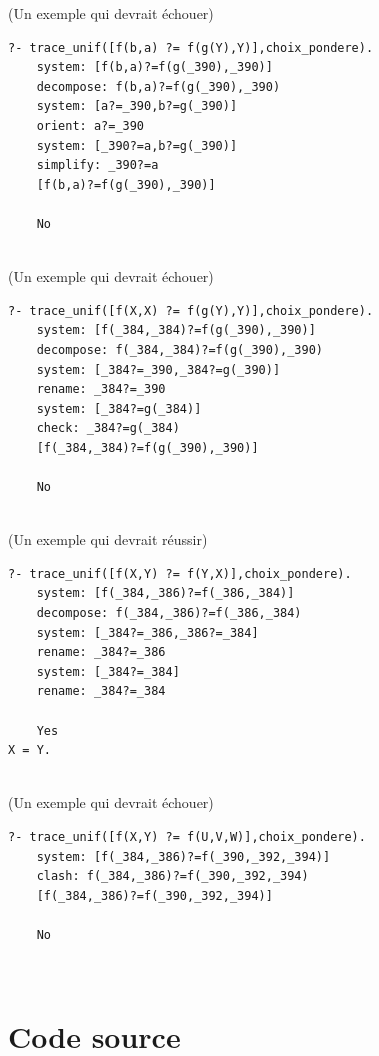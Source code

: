 \documentclass[10pt,a4paper]{report}
\begin{document}
(Un exemple qui devrait échouer)
\begin{lstlisting}[caption ={Des tests de cours}]
?- trace_unif([f(b,a) ?= f(g(Y),Y)],choix_pondere).
	system: [f(b,a)?=f(g(_390),_390)]
	decompose: f(b,a)?=f(g(_390),_390)
	system: [a?=_390,b?=g(_390)]
	orient: a?=_390
	system: [_390?=a,b?=g(_390)]
	simplify: _390?=a
	[f(b,a)?=f(g(_390),_390)]

	No
\end{lstlisting} ~\\

(Un exemple qui devrait échouer)
\begin{lstlisting}[caption ={Des tests de cours}]
?- trace_unif([f(X,X) ?= f(g(Y),Y)],choix_pondere).
	system: [f(_384,_384)?=f(g(_390),_390)]
	decompose: f(_384,_384)?=f(g(_390),_390)
	system: [_384?=_390,_384?=g(_390)]
	rename: _384?=_390
	system: [_384?=g(_384)]
	check: _384?=g(_384)
	[f(_384,_384)?=f(g(_390),_390)]

	No
\end{lstlisting} ~\\[2cm]

(Un exemple qui devrait réussir)
\begin{lstlisting}[caption ={Des tests de cours}]
?- trace_unif([f(X,Y) ?= f(Y,X)],choix_pondere).
	system: [f(_384,_386)?=f(_386,_384)]
	decompose: f(_384,_386)?=f(_386,_384)
	system: [_384?=_386,_386?=_384]
	rename: _384?=_386
	system: [_384?=_384]
	rename: _384?=_384

	Yes
X = Y.
\end{lstlisting} ~\\

(Un exemple qui devrait échouer)
\begin{lstlisting}[caption ={Des tests de cours}]
?- trace_unif([f(X,Y) ?= f(U,V,W)],choix_pondere).
	system: [f(_384,_386)?=f(_390,_392,_394)]
	clash: f(_384,_386)?=f(_390,_392,_394)
	[f(_384,_386)?=f(_390,_392,_394)]

	No
\end{lstlisting} ~\\







\mbox{}
\newpage
\chapter*{Code source}
\end{document}
